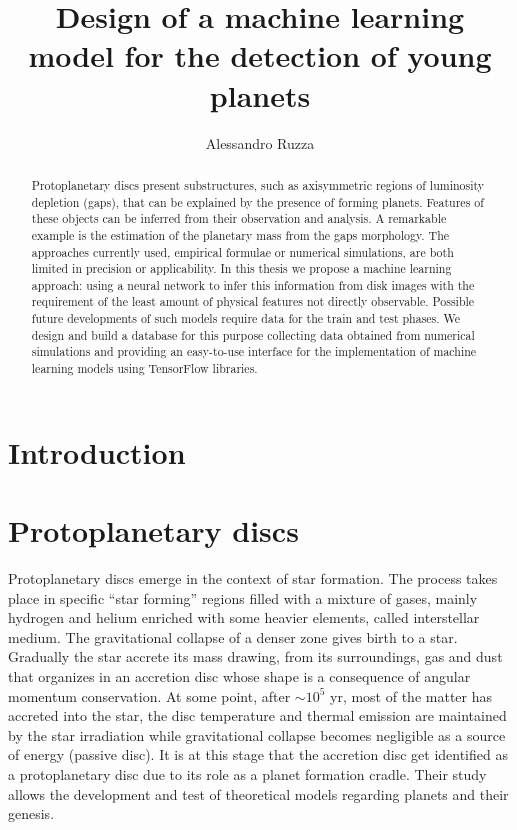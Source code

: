 \documentclass[a4paper,10pt]{report}
\title{Design of a machine learning model for the detection of young planets}
\author{Alessandro Ruzza}
\begin{document}
\maketitle

\begin{abstract}
    Protoplanetary discs present substructures,
    such as axisymmetric regions of luminosity depletion (gaps),
    that can be explained by the presence of forming planets. 
    Features of these objects can be inferred from their
    observation and analysis. A remarkable example is the 
    estimation of the planetary mass from the gaps morphology.
    The approaches currently used, empirical formulae or numerical
    simulations, are both limited in precision or applicability.
    In this thesis we propose a machine learning approach:
    using a neural network to infer this information from 
    disk images with the requirement of the least amount
    of physical features not directly observable.
    Possible future developments of such models require 
    data for the train and test phases.
    We design and build a database for this purpose collecting 
    data obtained from numerical simulations and providing an 
    easy-to-use interface for the implementation of machine learning
    models using TensorFlow libraries.
\end{abstract}

\tableofcontents

\chapter{Introduction}


\chapter{Protoplanetary discs}

Protoplanetary discs emerge in the context of star formation. 
The process takes place in specific ``star forming'' regions filled with a mixture of gases, mainly hydrogen and helium enriched with some
heavier elements, called interstellar medium. The gravitational collapse of a denser zone gives birth to a star. Gradually the star
accrete its mass drawing, from its surroundings, gas and dust that organizes in an accretion disc whose shape is a consequence of angular momentum conservation.
At some point, after $\sim 10^5$ yr, most of the matter has accreted into the star,
the disc temperature and thermal emission are maintained by the star irradiation while gravitational collapse becomes negligible as a source of energy (passive disc). 
It is at this stage that the accretion disc get identified
as a protoplanetary disc due to its role as a planet formation cradle.
Their study allows the development and test of theoretical models regarding planets and their genesis.
\end{document}
